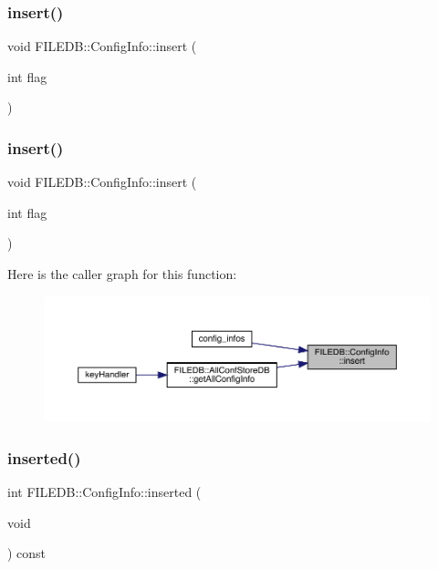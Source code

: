 \subsubsection{\texorpdfstring{insert()}{insert()}\hspace{0.1cm}{\footnotesize\ttfamily [1/2]}}
{\footnotesize\ttfamily void F\+I\+L\+E\+D\+B\+::\+Config\+Info\+::insert (\begin{DoxyParamCaption}\item[{int}]{flag }\end{DoxyParamCaption})}

\mbox{\label{classFILEDB_1_1ConfigInfo_a59ae164a1b55687a88e37d876c4f05f6}} 
\subsubsection{\texorpdfstring{insert()}{insert()}\hspace{0.1cm}{\footnotesize\ttfamily [2/2]}}
{\footnotesize\ttfamily void F\+I\+L\+E\+D\+B\+::\+Config\+Info\+::insert (\begin{DoxyParamCaption}\item[{int}]{flag }\end{DoxyParamCaption})}

Here is the caller graph for this function\+:\nopagebreak
\begin{figure}[H]
\begin{center}
\leavevmode
\includegraphics[width=350pt]{d0/d90/classFILEDB_1_1ConfigInfo_a59ae164a1b55687a88e37d876c4f05f6_icgraph}
\end{center}
\end{figure}
\mbox{\label{classFILEDB_1_1ConfigInfo_a45cc2aa85de0ccd89c06989bb9cff843}} 
\subsubsection{\texorpdfstring{inserted()}{inserted()}\hspace{0.1cm}{\footnotesize\ttfamily [1/2]}}
{\footnotesize\ttfamily int F\+I\+L\+E\+D\+B\+::\+Config\+Info\+::inserted (\begin{DoxyParamCaption}\item[{void}]{ }\end{DoxyParamCaption}) const}


